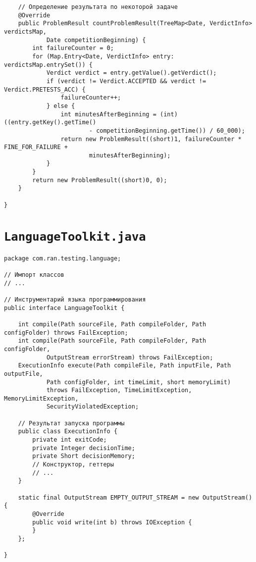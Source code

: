 \begin{verbatim}
    // Определение результата по некоторой задаче
    @Override
    public ProblemResult countProblemResult(TreeMap<Date, VerdictInfo> verdictsMap,
            Date competitionBeginning) {
        int failureCounter = 0;
        for (Map.Entry<Date, VerdictInfo> entry: verdictsMap.entrySet()) {
            Verdict verdict = entry.getValue().getVerdict();
            if (verdict != Verdict.ACCEPTED && verdict != Verdict.PRETESTS_ACC) {
                failureCounter++;
            } else {
                int minutesAfterBeginning = (int)((entry.getKey().getTime()
                        - competitionBeginning.getTime()) / 60_000);
                return new ProblemResult((short)1, failureCounter * FINE_FOR_FAILURE +
                        minutesAfterBeginning);
            }
        }
        return new ProblemResult((short)0, 0);
    }

}
\end{verbatim}

\section*{\texttt{LanguageToolkit.java}}
\begin{verbatim}
package com.ran.testing.language;

// Импорт классов
// ...

// Инструментарий языка программирования
public interface LanguageToolkit {
    
    int compile(Path sourceFile, Path compileFolder, Path configFolder) throws FailException;
    int compile(Path sourceFile, Path compileFolder, Path configFolder,
            OutputStream errorStream) throws FailException;
    ExecutionInfo execute(Path compileFile, Path inputFile, Path outputFile,
            Path configFolder, int timeLimit, short memoryLimit)
            throws FailException, TimeLimitException, MemoryLimitException,
            SecurityViolatedException;

    // Результат запуска программы
    public class ExecutionInfo {
        private int exitCode;
        private Integer decisionTime;
        private Short decisionMemory;
        // Конструктор, геттеры
        // ...
    }
    
    static final OutputStream EMPTY_OUTPUT_STREAM = new OutputStream() {
        @Override
        public void write(int b) throws IOException {
        }
    };
    
}
\end{verbatim}

